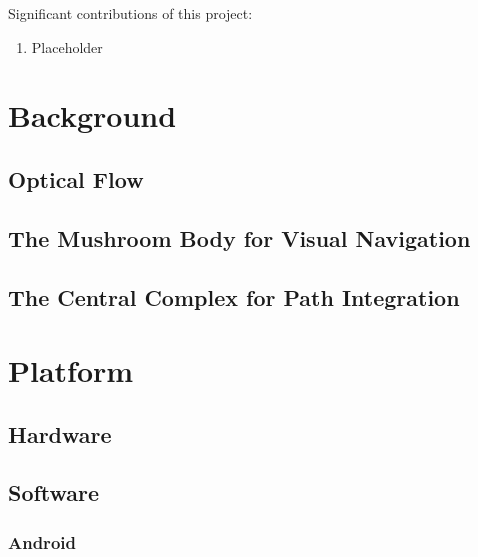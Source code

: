 \documentclass[a4paper,11pt,twoside,openright]{article}
\let\oldsection\section
\def\section{\cleardoublepage\oldsection}
\begin{document}
Significant contributions of this project:
\begin{enumerate}
  \item{Placeholder}
\end{enumerate}
\newpage

\section{ Background }
\subsection{ Optical Flow } \label{OFBackground}
\subsection{ The Mushroom Body for Visual Navigation } \label{MBBackground}
\subsection{ The Central Complex for Path Integration } \label{CXBackground}
\newpage

\section{ Platform } \label{sec:platform}
\subsection{ Hardware }
\subsection{ Software }
\subsubsection{ Android } \label{subsubsec:droid}
\end{document}
